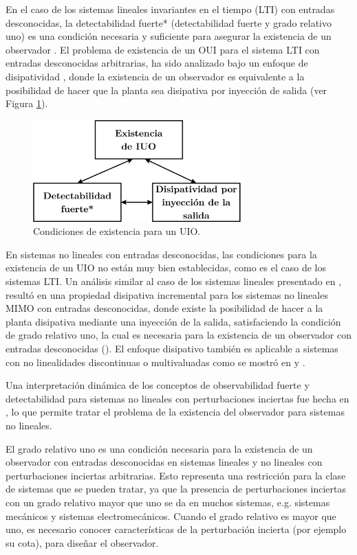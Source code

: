 \documentclass[11pt,letterpaper,twoside,openright]{report}
\begin{document}
	En el caso de los sistemas lineales  invariantes en el tiempo (LTI) con entradas desconocidas, la detectabilidad fuerte* (detectabilidad fuerte y grado relativo uno) es una condición necesaria y suficiente para asegurar la existencia de un observador \cite{Hautus1983}. El problema de existencia de un OUI para el sistema LTI con entradas desconocidas arbitrarias, ha sido analizado bajo un enfoque de disipatividad \cite{Moreno2001}, donde la existencia de un observador es equivalente a la posibilidad de hacer que la planta sea disipativa por inyección de salida (ver Figura \ref{Fig: Capitulo1 - Condiciones de existencia para un UIO}).
	
	\begin{figure}[hbtp]
		\centering
		\includegraphics[width=8cm]{Capitulo1_CondicionDeExistenciadeUIO.eps}
		\caption{Condiciones de existencia para un UIO.}
		\label{Fig: Capitulo1 - Condiciones de existencia para un UIO}
	\end{figure}
	\newpage
	En sistemas no lineales con entradas desconocidas, las condiciones para la existencia de un UIO no están muy bien establecidas, como es el caso de los sistemas LTI. Un análisis similar al caso de los sistemas lineales presentado en \cite{Moreno2001}, resultó en una propiedad disipativa incremental para los sistemas no lineales MIMO con entradas desconocidas, donde existe la posibilidad de hacer a la planta disipativa mediante una inyección de la salida, satisfaciendo la condición de grado relativo uno, la cual es necesaria para la existencia de un observador con entradas desconocidas (\cite{Rochacozatl2004}). El enfoque disipativo también es aplicable a sistemas con no linealidades discontinuas o multivaluadas como se mostró en  \cite{Osorio2006} y \cite{Baltazar2010}. 
	
	Una interpretación dinámica de los conceptos de observabilidad fuerte y detectabilidad para sistemas no lineales con perturbaciones inciertas fue hecha en \cite{Moreno2014}, lo que permite tratar el problema de la existencia del observador para sistemas no lineales.
	
	El grado relativo uno es una condición necesaria para la existencia de un observador con entradas desconocidas en sistemas lineales y no lineales con perturbaciones inciertas arbitrarias. Esto representa una restricción para la clase de sistemas que se pueden tratar, ya que la presencia de perturbaciones inciertas con un grado relativo mayor que uno se da en muchos sistemas, e.g. sistemas mecánicos y sistemas electromecánicos. Cuando el grado relativo es mayor que uno, es necesario conocer características de la perturbación incierta (por ejemplo su cota), para diseñar el observador.
	
\end{document}
